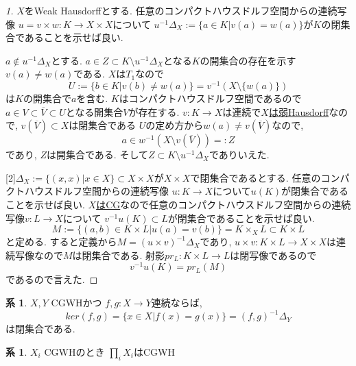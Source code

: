 \documentclass[dvipdfmx,a4paper,11pt]{article}
\theoremstyle{definition}
\newtheorem{cor}[thm]{系}
\begin{document}
\begin{proof}
[1]$X$をWeak Hausdorffとする. 
任意のコンパクトハウスドルフ空間からの連続写像
$u = v \times w : K \to X \times X$について
$u^{-1}\Delta_X := \{a \in K | v(a)=w(a) \}$が$K$の閉集合であることを示せば良い.

$a \not \in u^{-1}\Delta_X$とする.
$a \in Z \subset  K \setminus u^{-1}\Delta_X$となる$K$の開集合の存在を示す
$v(a) \neq w(a)$である. $X$は$T_1$なので
$$
U:= \{ b \in K | v(b) \neq w(a) \} = v^{-1}(X \setminus \{w(a)\})
$$
は$K$の開集合で$a$を含む.
$K$はコンパクトハウスドルフ空間であるので
$a \in V \subset \overline{V} \subset U$となる開集合$V$が存在する.
$v : K \to X$は連続で\underline{$X$は弱Hausdorff}なので, $v(\overline{V}) \subset X$は閉集合である
$U$の定め方から$w(a) \neq v(\overline{V})$なので, 
$$
a \in w^{-1}( X \setminus v(\overline{V}) ) =: Z
$$
であり,  $Z$は開集合である. 
そして$Z\subset K \setminus u^{-1}\Delta_X$でありいえた.

[2]$\Delta_X := \{ (x,x)| x \in X\}\subset X \times X$が$X \times X$で閉集合であるとする. 
任意のコンパクトハウスドルフ空間からの連続写像
$u : K \to X$について$u(K)$が閉集合であることを示せば良い.
\underline{$X$はCG}なので任意のコンパクトハウスドルフ空間からの連続写像$v : L \to X$について
$v^{-1}u(K) \subset L$が閉集合であることを示せば良い.
$$
M := \{ (a,b) \in K \times L | u(a) =v(b)\}=K\times_{X}L \subset K \times L
$$
と定める. 
すると定義から$M = (u \times v)^{-1}\Delta_{X}$であり, 
$u \times v : K \times L \to X \times X$は連続写像なので$M$は閉集合である. 
射影$pr_{L} : K \times L \to L$は閉写像であるので
$$
v^{-1}u(K) = pr_{L}(M)
$$
であるので言えた. 
\end{proof}

 \begin{tcolorbox}
 [colback = white, colframe = green!35!black, fonttitle = \bfseries,breakable = true]
\begin{cor}\cite[Cor2.15]{Str}
\label{Str-cor2.15}
$X,Y$ CGWHかつ
$f,g : X \to Y$連続ならば, 
$$
ker(f,g)=\{x \in X | f(x)=g(x) \}= (f, g)^{-1}\Delta_{Y}
$$
は閉集合である.
\end{cor}
\end{tcolorbox}

 \begin{tcolorbox}
 [colback = white, colframe = green!35!black, fonttitle = \bfseries,breakable = true]
\begin{cor}\cite[Cor2.16]{Str}
\label{Str^cor2.16}
$X_i$ CGWHのとき
$\prod_i X_i$はCGWH
\end{cor}
\end{tcolorbox}
\end{document}
